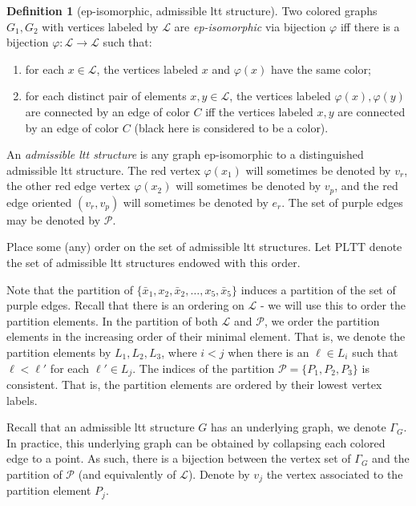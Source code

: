 \documentclass[11pt]{article}
\theoremstyle{definition}
\newtheorem{dfn}[thm]{Definition}
\begin{document}
\begin{dfn}[ep-isomorphic, admissible ltt structure]
Two colored graphs $G_1,G_2$ with vertices labeled by $\mathcal{L}$ are
\emph{ep-isomorphic} via bijection $\varphi$ iff there is a bijection $\varphi:\mathcal{L}\to\mathcal{L}$ such that:
\begin{enumerate}[label=(\roman*)]
  \item for each $x\in\mathcal{L}$, the vertices labeled $x$ and $\varphi(x)$ have
        the same color;
  \item for each distinct pair of elements $x,y\in\mathcal{L}$, the vertices labeled
        $\varphi(x),\varphi(y)$ are connected by an edge of color $C$ iff the vertices
        labeled $x,y$ are connected by an edge of color $C$ (black here is considered to be a color).
\end{enumerate}
An \emph{admissible ltt structure} is any graph ep-isomorphic to a distinguished
admissible ltt structure. The red vertex $\varphi(x_1)$ will sometimes be denoted by $v_r$, the other red edge vertex $\varphi(x_2)$ will sometimes be denoted by $v_p$, and the red edge oriented $(v_r,v_p)$ will sometimes be denoted by $e_r$. The set of purple edges may be denoted by $\mathcal{P}$. 

Place some (any) order on the set of admissible ltt structures. Let $\mathrm{PLTT}$ denote the set of admissible ltt structures endowed with this order.
\end{dfn}


Note that the partition of $\{\bar{x}_1,x_2,\bar{x}_2,\ldots,x_5,\bar{x}_5\}$ induces a partition of the set of purple edges. Recall that there is an ordering on $\mathcal{L}$ - we will use this to order the partition elements. In the partition of both $\mathcal{L}$ and $\mathcal{P}$, we order the partition elements in the increasing order of their minimal element. That is,  we denote the partition elements by $L_1, L_2, L_3$, where $i<j$ when there is an $\ell\in L_i$ such that $\ell<\ell'$ for each $\ell'\in L_j$. The indices of the partition $\mathcal{P}=\{P_1, P_2, P_3\}$ is consistent. That is, the partition elements are ordered by their lowest vertex labels. 

Recall that an admissible ltt structure $G$ has an underlying graph, we denote $\Gamma_G$. In practice, this underlying graph can be obtained by collapsing each colored edge to a point. As such, there is a bijection between the vertex set of $\Gamma_G$ and the partition of $\mathcal{P}$ (and equivalently of $\mathcal{L}$). Denote by $v_j$ the vertex associated to the partition element $P_j$.
\end{document}
